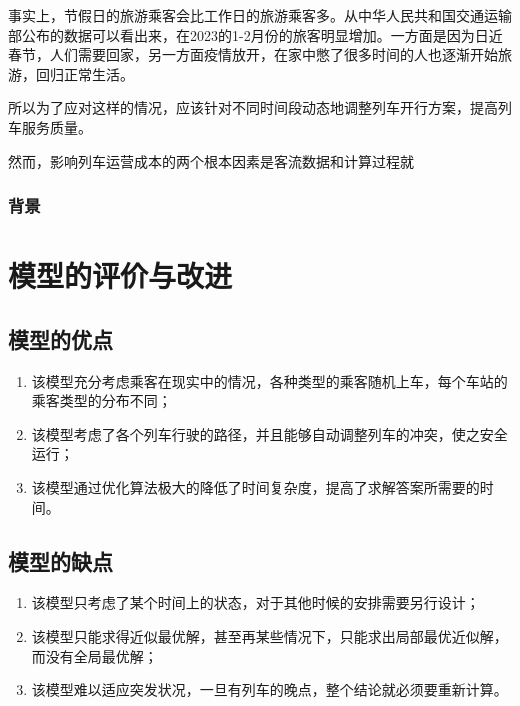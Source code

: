 事实上，节假日的旅游乘客会比工作日的旅游乘客多。从中华人民共和国交通运输部公布的数据可以看出来，在2023的1-2月份的旅客明显增加\cite{ChengShiKeYunTongJiShuJuZhongHuaRenMinGongHeGuoJiaoTongYunShuBu}。一方面是因为日近春节，人们需要回家，另一方面疫情放开，在家中憋了很多时间的人也逐渐开始旅游，回归正常生活。

所以为了应对这样的情况，应该针对不同时间段动态地调整列车开行方案，提高列车服务质量。

然而，影响列车运营成本的两个根本因素是客流数据和计算过程就

\subsubsection{背景}


%
%

\section{模型的评价与改进}

\subsection{模型的优点}

\begin{enumerate}
    \item 该模型充分考虑乘客在现实中的情况，各种类型的乘客随机上车，每个车站的乘客类型的分布不同；
    \item 该模型考虑了各个列车行驶的路径，并且能够自动调整列车的冲突，使之安全运行；
    \item 该模型通过优化算法极大的降低了时间复杂度，提高了求解答案所需要的时间。
\end{enumerate}

\subsection{模型的缺点}

\begin{enumerate}
    \item 该模型只考虑了某个时间上的状态，对于其他时候的安排需要另行设计；
    \item 该模型只能求得近似最优解，甚至再某些情况下，只能求出局部最优近似解，而没有全局最优解；
    \item 该模型难以适应突发状况，一旦有列车的晚点，整个结论就必须要重新计算。
\end{enumerate}

